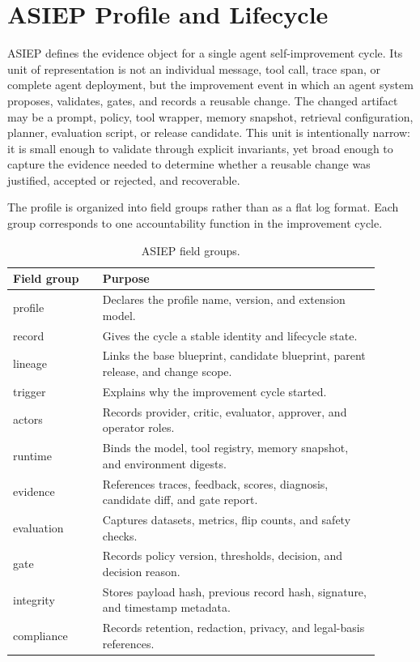 \section{ASIEP Profile and Lifecycle}

ASIEP defines the evidence object for a single agent self-improvement cycle. Its unit of representation is not an individual message, tool call, trace span, or complete agent deployment, but the improvement event in which an agent system proposes, validates, gates, and records a reusable change. The changed artifact may be a prompt, policy, tool wrapper, memory snapshot, retrieval configuration, planner, evaluation script, or release candidate. This unit is intentionally narrow: it is small enough to validate through explicit invariants, yet broad enough to capture the evidence needed to determine whether a reusable change was justified, accepted or rejected, and recoverable.

The profile is organized into field groups rather than as a flat log format. Each group corresponds to one accountability function in the improvement cycle.

\begin{table}[t]
\centering
\caption{ASIEP field groups.}
\begin{tabular}{p{0.22\linewidth}p{0.68\linewidth}}
\toprule
Field group & Purpose \\
\midrule
profile & Declares the profile name, version, and extension model. \\
record & Gives the cycle a stable identity and lifecycle state. \\
lineage & Links the base blueprint, candidate blueprint, parent release, and change scope. \\
trigger & Explains why the improvement cycle started. \\
actors & Records provider, critic, evaluator, approver, and operator roles. \\
runtime & Binds the model, tool registry, memory snapshot, and environment digests. \\
evidence & References traces, feedback, scores, diagnosis, candidate diff, and gate report. \\
evaluation & Captures datasets, metrics, flip counts, and safety checks. \\
gate & Records policy version, thresholds, decision, and decision reason. \\
integrity & Stores payload hash, previous record hash, signature, and timestamp metadata. \\
compliance & Records retention, redaction, privacy, and legal-basis references. \\
\bottomrule
\end{tabular}
\end{table}


